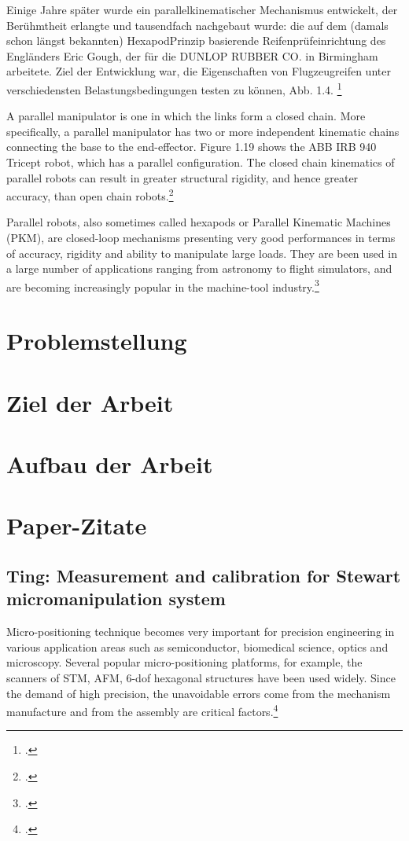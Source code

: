 Einige Jahre später wurde ein parallelkinematischer Mechanismus entwickelt, der Berühmtheit erlangte und tausendfach nachgebaut wurde: die auf dem (damals schon längst bekannten) Hexapod\-Prinzip basierende Reifenprüfeinrichtung des Engländers Eric Gough, der für die DUNLOP RUBBER CO. in Birmingham arbeitete. Ziel der Entwicklung war, die Eigenschaften von Flugzeugreifen unter verschiedensten Belastungsbedingungen testen zu können, Abb. 1.4. \footcite[Vgl.][4]{Neugebauer2006}

\begin{em}
A parallel manipulator is one in which the links form a closed chain. More specifically, a
parallel manipulator has two or more independent kinematic chains connecting the base to
the end-effector. Figure 1.19 shows the ABB IRB 940 Tricept robot, which has a parallel
configuration. The closed chain kinematics of parallel robots can result in greater structural
rigidity, and hence greater accuracy, than open chain robots.\footcite[Vgl.][18]{Spong2004}
\end{em}

\begin{em}
Parallel robots, also sometimes called hexapods or Parallel Kinematic Machines (PKM), are closed-loop mechanisms presenting very good performances in terms of accuracy, rigidity and ability to manipulate large loads.
They are been used in a large number of applications ranging from astronomy to flight simulators, and are becoming increasingly popular in the
machine-tool industry.\footcite[Vgl.][XV]{Merlet2006}
\end{em}

\section{Problemstellung}

\section{Ziel der Arbeit}

\section{Aufbau der Arbeit}

\section{Paper-Zitate}

\subsection{Ting: Measurement and calibration for Stewart micromanipulation system}
Micro-positioning technique becomes very important for
precision engineering in various application areas such as semiconductor, biomedical science, optics and microscopy. Several
popular micro-positioning platforms, for example, the scanners of STM, AFM, 6-dof hexagonal structures have been used
widely. Since the demand of high precision, the unavoidable
errors come from the mechanism manufacture and from the
assembly are critical factors.\footcite[Vgl.][226]{Ting2007}

